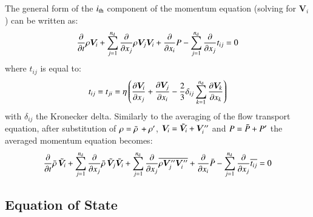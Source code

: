 \documentclass{warpdoc}
\newcommand{\nd}{{{n}_{\rm d}}}
\newcommand{\mfd}{\displaystyle}
\begin{document}
The general form of the $i_{\rm th}$ component of the momentum equation (solving for $\bm{V}_i$)
can be written as:
%
\begin{equation}
    \frac{\partial }{\partial t} \rho  \bm{V}_i
   +  \sum_{j=1}^{\nd} \frac{\partial }{\partial x_j} \rho  \bm{V}_j  \bm{V}_i
   +  \frac{\partial }{\partial x_i} P
   -  \sum_{j=1}^{\nd} \frac{\partial }{\partial x_j} t_{ij}   = 0
  \label{eqn:M:1}
\end{equation}
%
where $t_{ij}$ is equal to:
%
\begin{equation}
  t_{ij} = t_{ji} = \eta \left( \frac{\partial \bm{V}_i}{\partial x_j}
                   +  \frac{\partial \bm{V}_j}{\partial x_i}
                   -  \frac{2}{3} \delta_{ij} \sum_{k=1}^{\nd} \frac{\partial \bm{V}_k}{\partial x_k}
         \right)
  \label{eqn:tij}
\end{equation}
%
with $\delta_{ij}$ the Kronecker delta. Similarly to the averaging of the flow
transport equation, after substitution of $\rho=\bar{\rho}\,+\rho^{\prime}$,
$\bm{V}_i={\tilde{\bm{V}}_i}+\bm{V}_i^{\prime\prime}$ and $P=\bar{P}+P^{\prime}$ the averaged momentum
equation becomes:
%
\begin{equation}
  \mfd\frac{\partial}{\partial t}  \wbar{\rho}\,  {\wtilde{\bm{V}}_i}
      +  \sum_{j=1}^{\nd} \frac{\partial }{\partial x_j}
             \wbar{\rho}\, {\wtilde{\bm{V}}_j} {\wtilde{\bm{V}}_i}
      + \sum_{j=1}^{\nd} \frac{\partial }{\partial x_j}
             \overline{\rho \bm{V}_j^{\prime\prime} \bm{V}_i^{\prime\prime}}
      +  \frac{\partial }{\partial x_i} \wbar{P}
      -  \sum_{j=1}^{\nd} \frac{\partial }{\partial x_j} \overline{t_{ij}}
      = 0
  \label{eqn:M:final}
\end{equation}
%





\subsection{Equation of State}
\end{document}

